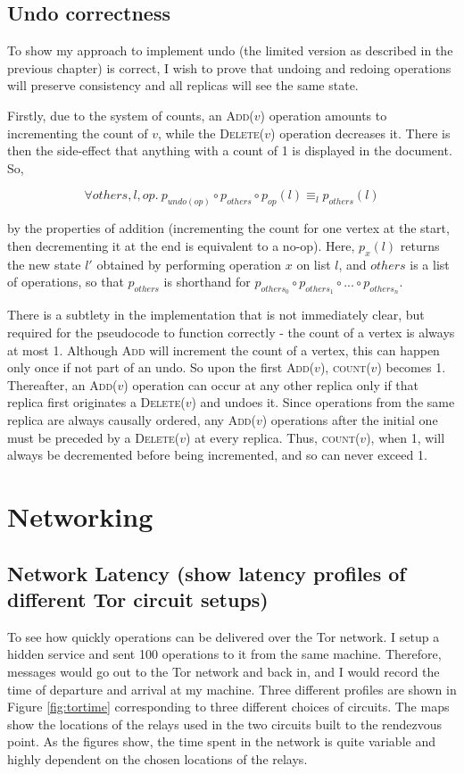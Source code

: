 \documentclass[diss.tex]{subfiles}
\begin{document}
\subsection{Undo correctness}

To show my approach to implement undo (the limited version as described in the previous chapter) is correct, 
I wish to prove that undoing and redoing operations will preserve consistency and all replicas will see the same state.

Firstly, due to the system of counts, an \textsc{Add}($v$) operation amounts to incrementing the count of $v$, while the \textsc{Delete}($v$) operation decreases it. There is then the side-effect that anything with a count of 1 is displayed in the document. So,

$$ \forall others, l, op.~ p_{undo(op)} \circ p_{others} \circ p_{op}(l)  \equiv_l p_{others}(l)$$

by the properties of addition (incrementing the count for one vertex at the start, then decrementing it at the end is equivalent to a no-op).
Here, $p_x(l)$ returns the new state $l'$ obtained by performing operation $x$ on list $l$, and $others$ is a list of operations, so that $p_{others}$ is shorthand for $p_{others_0} \circ p_{others_1} \circ ... \circ p_{others_n}$. 

There is a subtlety in the implementation that is not immediately clear, but required for the pseudocode to function correctly - the count of a vertex is always at most 1. Although \textsc{Add} will increment the count of a vertex, this can happen only once if not part of an undo. So upon the first \textsc{Add}($v$), \textsc{count}($v$) becomes 1. Thereafter, an \textsc{Add}($v$) operation can occur at any other replica only if that replica first originates a \textsc{Delete}($v$) and undoes it. Since operations from the same replica are always causally ordered, any \textsc{Add}($v$) operations after the initial one must be preceded by a \textsc{Delete}($v$) at every replica. Thus, \textsc{count}($v$), when 1, will always be decremented before being incremented, and so can never exceed 1.

\section{Networking}
\subsection{Network Latency (show latency profiles of different Tor circuit setups)}
To see how quickly operations can be delivered over the Tor network. I setup a hidden service and sent 100 operations to it from the same machine. Therefore, messages would go out to the Tor network and back in, and I would record the time of departure and arrival at my machine. Three different profiles are shown in Figure \ref{fig:tortime} corresponding to three different choices of circuits. The maps show the locations of the relays used in the two circuits built to the rendezvous point. As the figures show, the time spent in the network is quite variable and highly dependent on the chosen locations of the relays. 
\end{document}
